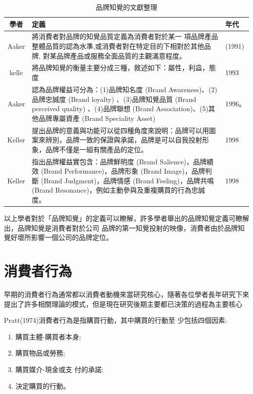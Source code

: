 


\begin{table}[htb]
\caption{品牌知覺的文獻整理}
\label{tab:PL2}
\centering
%
\begin{tabular}[t]{|c|p{8.5cm}|p{2.5cm}|} %
\hline
學者&定義 & 年代 \tabularnewline
\hline
Aaker & 將消費者對品牌的知覺品質定義為消費者對於某一 項品牌產品整體品質的認為水準,或消費者對在特定目的下相對於其他品牌, 對某品牌產品或服務全面品質的主觀滿意程度。& (1991)  \tabularnewline
\hline
kelle&將品牌知覺的衡量主要分成三種，敘述如下：屬性，利益，態度& 1993 \tabularnewline
\hline
Aaker&認為品牌權益可分為：(1)品牌知名度 (Brand Awareness)、(2)品牌忠誠度 (Brand loyalty) 、(3)品牌知覺品質 (Brand perceived quality) 、(4)品牌聯想 (Brand Association)、(5)其他品牌專屬資產 (Brand Speciality Asset) &1996。\tabularnewline
\hline
Keller&提出品牌的意義與功能可以從四種角度來說明：品牌可以用圖案來辨別，品牌一致的保證與承諾，品牌是可以自我投射形象，品牌不僅是一組有關產品的定位。&1998 \tabularnewline
\hline
Keller&指出品牌權益實包含：品牌鮮明度 (Brand Salience)，品牌績效 (Brand Performance)，品牌形象 (Brand Image)，品牌判斷 (Brand Judgment)，品牌情感 (Brand Feeling)，品牌共鳴 (Brand Resonance)，例如主動參與及重複購買的行為忠誠度。&1998 \tabularnewline
\hline
\end{tabular}
\end{table}
以上學者對於「品牌知覺」的定義可以瞭解，許多學者舉出的品牌知覺定義可瞭解出，品牌知覺是消費者對於公司 品牌的第一知覺投射的映像，消費者由於品牌知覺好壞所影響一個公司的品牌定位。


\section{消費者行為}
早期的消費者行為通常都以消費者動機來當研究核心，隨著各位學者長年研究下來提出了許多相關理論的模式，但是現在研究後期主要都已決策的過程為主要核心

Pratt(1974)\cite{Pratt1974}消費者行為是指購買行動，其中購買的行動至 少包括四個因素:
\begin{enumerate}
\item 購買主體-購買者本身; 
\item  購買物品或勞務;
\item  購買媒介-現金或支 付的承諾;
\item  決定購買的行動。
\end{enumerate}

